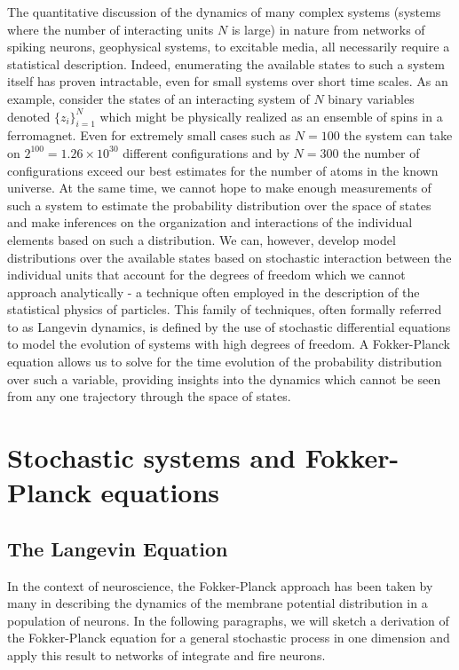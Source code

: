 \documentclass{ucetd}
\begin{document}
The quantitative discussion of the dynamics of many complex systems (systems where the number of interacting units $N$ is large) in nature from networks of spiking neurons, geophysical systems, to excitable media, all necessarily require a statistical description. Indeed, enumerating the available states to such a system itself has proven intractable, even for small systems over short time scales. As an example, consider the states of an interacting system of $N$ binary variables denoted $\{z_{i}\}_{i=1}^{N}$ which might be physically realized as an ensemble of spins in a ferromagnet. Even for extremely small cases such as $N=100$ the system can take on $2^{100} = 1.26\times 10^{30}$ different configurations and by $N=300$ the number of configurations exceed our best estimates for the number of atoms in the known universe. At the same time, we cannot hope to make enough measurements of such a system to estimate the probability distribution over the space of states and make inferences on the organization and interactions of the individual elements based on such a distribution. We can, however, develop model distributions over the available states based on stochastic interaction between the individual units that account for the degrees of freedom which we cannot approach analytically - a technique often employed in the description of the statistical physics of particles. This family of techniques, often formally referred to as Langevin dynamics, is defined by the use of stochastic differential equations to model the evolution of systems with high degrees of freedom. A Fokker-Planck equation allows us to solve for the time evolution of the probability distribution over such a variable, providing insights into the dynamics which cannot be seen from any one trajectory through the space of states. 

\chapter{Stochastic systems and Fokker-Planck equations}

\section{The Langevin Equation}



In the context of neuroscience, the Fokker-Planck approach has been taken by many in describing the dynamics of the membrane potential distribution in a population of neurons. In the following paragraphs, we will sketch a derivation of the Fokker-Planck equation for a general stochastic process in one dimension and apply this result to networks of integrate and fire neurons.
\end{document}
